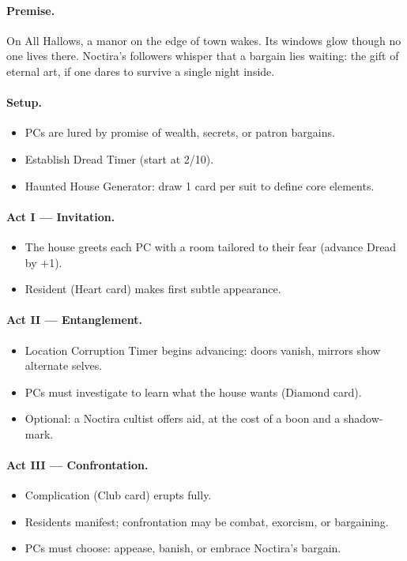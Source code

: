 \documentclass[11pt]{article}
\begin{document}
\paragraph{Premise.}
On All Hallows, a manor on the edge of town wakes. Its windows glow though no one lives there. Noctira's followers whisper that a bargain lies waiting: the gift of eternal art, if one dares to survive a single night inside.

\paragraph{Setup.}
\begin{itemize}
  \item PCs are lured by promise of wealth, secrets, or patron bargains.
  \item Establish Dread Timer (start at 2/10).
  \item Haunted House Generator: draw 1 card per suit to define core elements.
\end{itemize}

\paragraph{Act I --- Invitation.}
\begin{itemize}
  \item The house greets each PC with a room tailored to their fear (advance Dread by +1).
  \item Resident (Heart card) makes first subtle appearance.
\end{itemize}

\paragraph{Act II --- Entanglement.}
\begin{itemize}
  \item Location Corruption Timer begins advancing: doors vanish, mirrors show alternate selves.
  \item PCs must investigate to learn what the house wants (Diamond card).
  \item Optional: a Noctira cultist offers aid, at the cost of a boon and a shadow-mark.
\end{itemize}

\paragraph{Act III --- Confrontation.}
\begin{itemize}
  \item Complication (Club card) erupts fully.
  \item Residents manifest; confrontation may be combat, exorcism, or bargaining.
  \item PCs must choose: appease, banish, or embrace Noctira's bargain.
\end{itemize}
\end{document}
